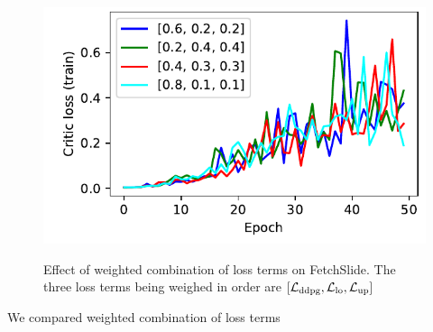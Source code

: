 \begin{figure}
  \includegraphics[width=\frac\columnwidth]{./media/res/04a8fc6-814a3d24-FetchSlide-v1-fwrl-future/train/critic_loss.pdf}%
  \label{fig:loss-term-weights}%
  \caption{Effect of weighted combination of loss terms on FetchSlide. The three
  loss terms being weighed in order are $[\mathcal{L}_{\text{ddpg}}, \mathcal{L}_{\text{lo}}, \mathcal{L}_{\text{up}}]$}%
\end{figure}%
% 
We compared weighted combination of loss terms

